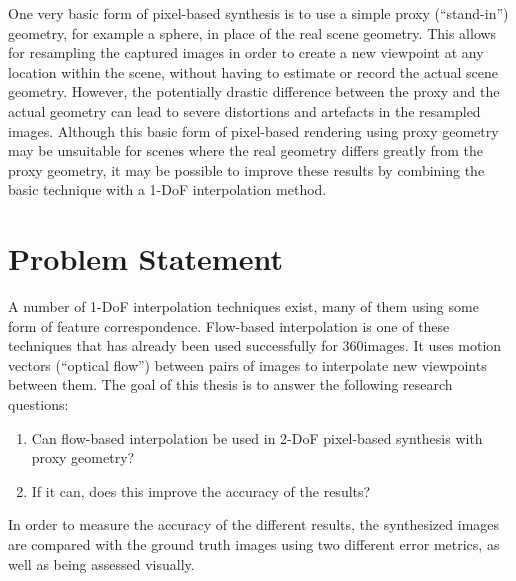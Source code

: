 One very basic form of pixel-based synthesis is to use a simple proxy (``stand-in'') geometry, for example a sphere, in place of the real scene geometry\footnotemark. This allows for resampling the captured images in order to create a new viewpoint at any location within the scene, without having to estimate or record the actual scene geometry. However, the potentially drastic difference between the proxy and the actual geometry can lead to severe distortions and artefacts in the resampled images. Although this basic form of pixel-based rendering using proxy geometry may be unsuitable for scenes where the real geometry differs greatly from the proxy geometry, it may be possible to improve these results by combining the basic technique with a 1-DoF interpolation method.

\section*{Problem Statement}
A number of 1-DoF interpolation techniques exist, many of them using some form of feature correspondence. Flow-based interpolation is one of these techniques that has already been used successfully for 360\degree images. It uses motion vectors (``optical flow'') between pairs of images to interpolate new viewpoints between them. The goal of this thesis is to answer the following research questions:

\begin{enumerate}
  \item Can flow-based interpolation be used in 2-DoF pixel-based synthesis with proxy geometry?
  \item If it can, does this improve the accuracy of the results?
\end{enumerate}

In order to measure the accuracy of the different results, the synthesized images are compared with the ground truth images using two different error metrics, as well as being assessed visually.


